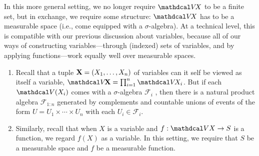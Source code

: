 In this more general setting, we no longer require $\V\!X$ to be a finite set, but in exchange, we require some structure: $\V\!X$ has to be a measurable space (i.e., come equipped with a $\sigma$-algebra).
At a technical level, this is compatible with our previous discussion about variables, because all of our ways of constructing variables---through (indexed) sets of variables, and by applying functions---work equally well over measurable spaces. 
\begin{enumerate}
\item Recall that a tuple $\mathbf X = (X_1, \ldots, X_n)$ of variables can it self be viewed as itself a variable,
    $\V\!\mat X = \prod_{i=1}^n \V \! X_i$.
But if each $\V(X_i)$ comes with a $\sigma$-algebra $\mathcal F_i$ , then there is a natural product algebra $\mathcal F_{1:n}$ generated by complements and countable unions of events of the form $U = U_1 \times \cdots \times U_n$ with each $U_i \in \mathcal F_i$. 

\item Similarly, recall that when $X$ is a variable and $f : \V X \to S$ is a function, we regard $f(X)$ as a variable. In this setting, we require that $S$ be a measurable space and $f$ be a measurable function.  
\end{enumerate}




% 



